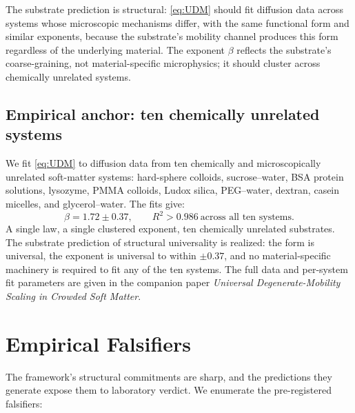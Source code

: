 \documentclass[11pt,a4paper]{article}
\begin{document}
The substrate prediction is structural: \eqref{eq:UDM} should fit diffusion data across systems whose microscopic mechanisms differ, with the same functional form and similar exponents, because the substrate's mobility channel produces this form regardless of the underlying material. The exponent $\beta$ reflects the substrate's coarse-graining, not material-specific microphysics; it should cluster across chemically unrelated systems.

\subsection{Empirical anchor: ten chemically unrelated systems}

We fit \eqref{eq:UDM} to diffusion data from ten chemically and microscopically unrelated soft-matter systems: hard-sphere colloids, sucrose--water, BSA protein solutions, lysozyme, PMMA colloids, Ludox silica, PEG--water, dextran, casein micelles, and glycerol--water. The fits give:
\begin{equation}
\beta = 1.72 \pm 0.37, \qquad R^2 > 0.986\ \text{across all ten systems.}
\end{equation}
A single law, a single clustered exponent, ten chemically unrelated substrates. The substrate prediction of structural universality is realized: the form is universal, the exponent is universal to within $\pm 0.37$, and no material-specific machinery is required to fit any of the ten systems. The full data and per-system fit parameters are given in the companion paper \emph{Universal Degenerate-Mobility Scaling in Crowded Soft Matter}.

\section{Empirical Falsifiers}\label{sec:empirical}

The framework's structural commitments are sharp, and the predictions they generate expose them to laboratory verdict. We enumerate the pre-registered falsifiers:
\end{document}
